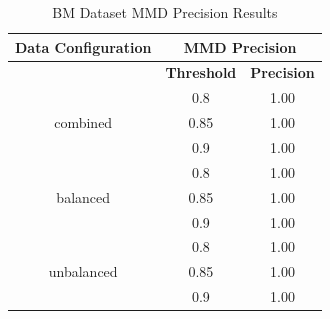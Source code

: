 \documentclass{mpaper}
\begin{document}
\begin{table}[]
\centering
\begin{tabular}{|c|cc|}
\hline
\textbf{Data Configuration} & \multicolumn{2}{c|}{\textbf{MMD Precision}}                  \\ \hline
\textbf{}                   & \multicolumn{1}{c|}{\textbf{Threshold}} & \textbf{Precision} \\ \hline
                            & \multicolumn{1}{c|}{0.8}                & 1.00               \\
combined                    & \multicolumn{1}{c|}{0.85}               & 1.00               \\
                            & \multicolumn{1}{c|}{0.9}                & 1.00               \\ \hline
                            & \multicolumn{1}{c|}{0.8}                & 1.00               \\
balanced                    & \multicolumn{1}{c|}{0.85}               & 1.00               \\
                            & \multicolumn{1}{c|}{0.9}                & 1.00               \\ \hline
                            & \multicolumn{1}{c|}{0.8}                & 1.00               \\
unbalanced                  & \multicolumn{1}{c|}{0.85}               & 1.00               \\
                            & \multicolumn{1}{c|}{0.9}                & 1.00               \\ \hline
\end{tabular}
\caption{\label{tab:bm_mmd_precision}BM Dataset MMD Precision Results}
\end{table}
\end{document}
